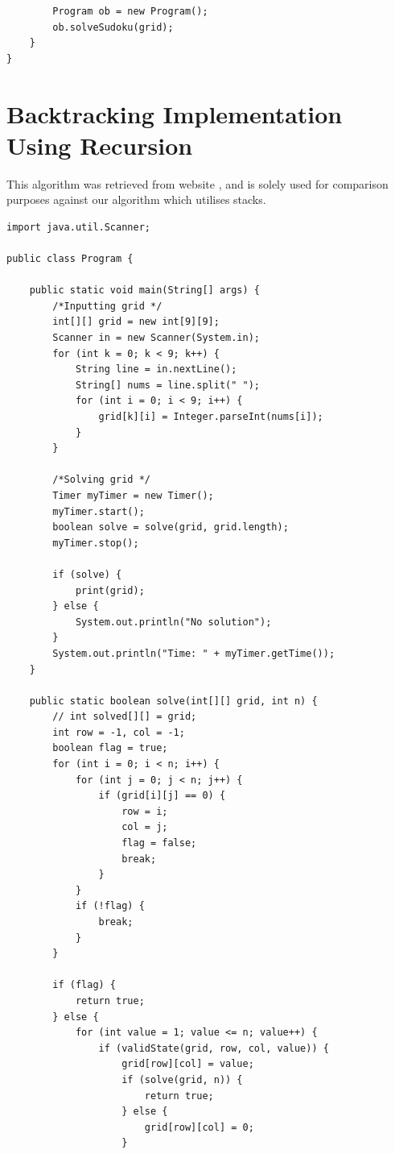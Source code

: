 \documentclass[11pt]{article}
\begin{document}
\begin{appendices}
\begin{lstlisting}
        Program ob = new Program();
        ob.solveSudoku(grid);
    }
}
\end{lstlisting}

\newpage
\section{Backtracking Implementation Using Recursion}
This algorithm was retrieved from website \cite{art6}, and is solely used for 
comparison purposes against our algorithm which utilises stacks.

\vspace{3mm}
\begin{lstlisting}
import java.util.Scanner;

public class Program {

    public static void main(String[] args) {
        /*Inputting grid */
        int[][] grid = new int[9][9];
        Scanner in = new Scanner(System.in);
        for (int k = 0; k < 9; k++) {
            String line = in.nextLine();
            String[] nums = line.split(" ");
            for (int i = 0; i < 9; i++) {
                grid[k][i] = Integer.parseInt(nums[i]);
            }
        }

        /*Solving grid */
        Timer myTimer = new Timer();
        myTimer.start();
        boolean solve = solve(grid, grid.length);
        myTimer.stop();

        if (solve) {
            print(grid);
        } else {
            System.out.println("No solution");
        }
        System.out.println("Time: " + myTimer.getTime());
    }

    public static boolean solve(int[][] grid, int n) {
        // int solved[][] = grid;
        int row = -1, col = -1;
        boolean flag = true;
        for (int i = 0; i < n; i++) {
            for (int j = 0; j < n; j++) {
                if (grid[i][j] == 0) {
                    row = i;
                    col = j;
                    flag = false;
                    break;
                }
            }
            if (!flag) {
                break;
            }
        }

        if (flag) {
            return true;
        } else {
            for (int value = 1; value <= n; value++) {
                if (validState(grid, row, col, value)) {
                    grid[row][col] = value;
                    if (solve(grid, n)) {
                        return true;
                    } else {
                        grid[row][col] = 0;
                    }


\end{lstlisting}
\end{appendices}
\end{document}
